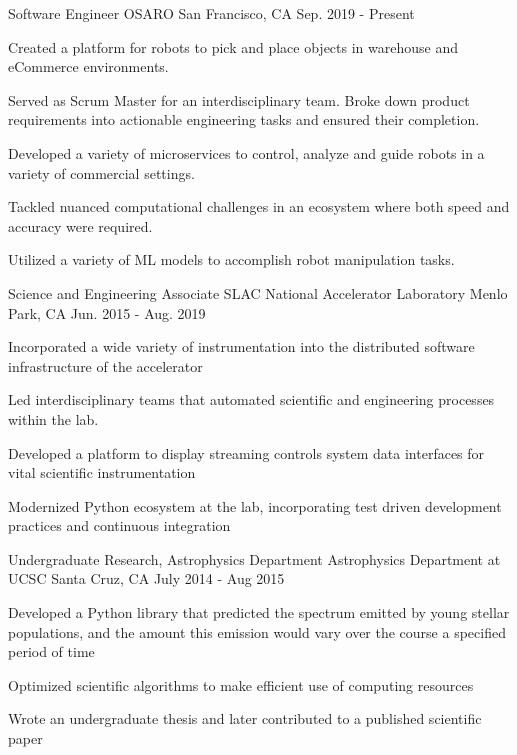 \begin{cventries}
  \cventry
    {Software Engineer}
    {OSARO}
    {San Francisco, CA}
    {Sep. 2019 - Present}
    {
      \begin{cvitems}
        \item {Created a platform for robots to pick and place objects in warehouse and eCommerce environments.}
	\item {Served as Scrum Master for an interdisciplinary team.
               Broke down product requirements into actionable engineering tasks and ensured their completion. 
	       } 
        \item {Developed a variety of microservices to control, analyze and guide robots in a variety of commercial settings.}
        \item {Tackled nuanced computational challenges in an ecosystem where both speed and accuracy were required.}
	\item {Utilized a variety of ML models to accomplish robot manipulation tasks.}
      \end{cvitems}
    }
  \cventry
    {Science and Engineering Associate}
    {SLAC National Accelerator Laboratory}
    {Menlo Park, CA}
    {Jun. 2015 - Aug. 2019}
    {
      \begin{cvitems}
	\item {Incorporated a wide variety of instrumentation into the
	       distributed software infrastructure of the accelerator} 
        \item {Led interdisciplinary teams that automated scientific and engineering processes within the lab.}
        \item {Developed a platform to display streaming controls system data
	       interfaces for vital scientific instrumentation}
	\item {Modernized Python ecosystem at the lab, incorporating test
	       driven development practices and continuous integration}
      \end{cvitems}
    }
  \cventry
    {Undergraduate Research, Astrophysics Department}
    {Astrophysics Department at UCSC}
    {Santa Cruz, CA}
    {July 2014 - Aug 2015}
    {
      \begin{cvitems}
        \item {Developed a Python library that predicted the spectrum emitted by young
               stellar populations, and the amount this emission would vary
               over the course a specified period of time}
        \item {Optimized scientific algorithms to make efficient use of computing resources}
        \item {Wrote an undergraduate thesis and later contributed to a
               published scientific paper}
      \end{cvitems}
      }
\end{cventries}
